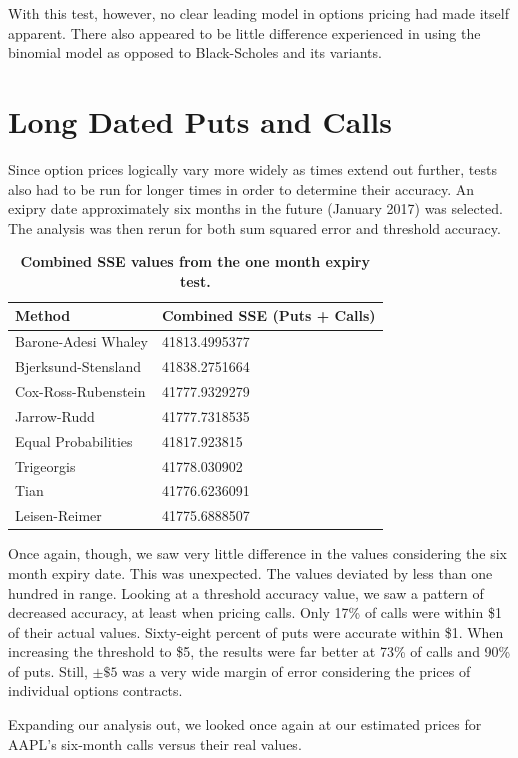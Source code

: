 With this test, however, no clear leading model in options pricing had made itself apparent. There also appeared to be little difference experienced in using the binomial model as opposed to Black-Scholes and its variants.

\section{Long Dated Puts and Calls}

Since option prices logically vary more widely as times extend out further, tests also had to be run for longer times in order to determine their accuracy. An exipry date approximately six months in the future (January 2017) was selected. The analysis was then rerun for both sum squared error and threshold accuracy. 

\begin{table}[h!]
\centering
\begin{tabu} to .8\textwidth { | X[c] | X[c] | }
 \hline
Method & Combined SSE (Puts + Calls)\\
 \hline
Barone-Adesi Whaley & 41813.4995377\\
Bjerksund-Stensland &  41838.2751664\\
Cox-Ross-Rubenstein & 41777.9329279\\
Jarrow-Rudd & 41777.7318535 \\
 Equal Probabilities & 41817.923815\\
Trigeorgis & 41778.030902 \\
Tian & 41776.6236091\\
Leisen-Reimer & 41775.6888507\\
\hline
\end{tabu}
\caption {\textbf{Combined SSE values from the one month expiry test.}}
\end{table}


Once again, though, we saw very little difference in the values considering the six month expiry date. This was unexpected.  The values deviated by less than one hundred in range. Looking at a threshold accuracy value, we saw a pattern of decreased accuracy, at least when pricing calls. Only 17\% of calls were within \$1 of their actual values. Sixty-eight percent of puts were accurate within \$1. When increasing the threshold to \$5, the results were far better at 73\% of calls and 90\% of puts. Still, $\pm\$5$ was a very wide margin of error considering the prices of individual options contracts.

Expanding our analysis out, we looked once again at our estimated prices for AAPL's six-month calls versus their real values. 

